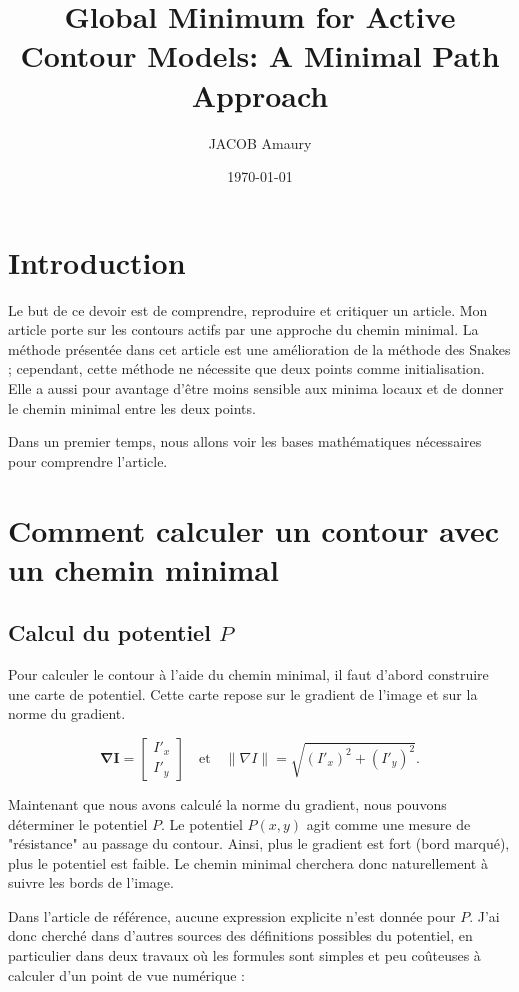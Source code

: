 \documentclass{article}
\title{Global Minimum for Active Contour Models: A Minimal Path Approach}
\author{JACOB Amaury}
\date{\today}
\begin{document}
\maketitle
\tableofcontents

\section{Introduction}
Le but de ce devoir est de comprendre, reproduire et critiquer un article.
Mon article porte sur les contours actifs par une approche du chemin minimal.
La méthode présentée dans cet article est une amélioration de la méthode des Snakes ;
cependant, cette méthode ne nécessite que deux points comme initialisation.
Elle a aussi pour avantage d'être moins sensible aux minima locaux
et de donner le chemin minimal entre les deux points.

Dans un premier temps, nous allons voir les bases mathématiques nécessaires
pour comprendre l'article.

\section{Comment calculer un contour avec un chemin minimal}
\subsection{Calcul du potentiel $P$}

Pour calculer le contour à l'aide du chemin minimal, il faut d'abord construire une 
carte de potentiel. Cette carte repose sur le gradient de l'image et sur la norme 
du gradient.

\begin{equation}
\mathbf{\nabla I} =
\begin{bmatrix}
I'_x \\[4pt]
I'_y
\end{bmatrix}
\quad\text{et}\quad
\|\nabla I\| = \sqrt{(I'_x)^2 + (I'_y)^2}.
\end{equation}

Maintenant que nous avons calculé la norme du gradient, nous pouvons déterminer le potentiel $P$.
Le potentiel $P(x,y)$ agit comme une mesure de "résistance" au passage du contour.
Ainsi, plus le gradient est fort (bord marqué), plus le potentiel est faible.
Le chemin minimal cherchera donc naturellement à suivre les bords de l'image.


Dans l'article de référence, aucune expression explicite n'est donnée pour $P$.  
J'ai donc cherché dans d'autres sources des définitions possibles du potentiel, en particulier dans deux travaux
où les formules sont simples et peu coûteuses à calculer d'un point de vue numérique :
\end{document}
